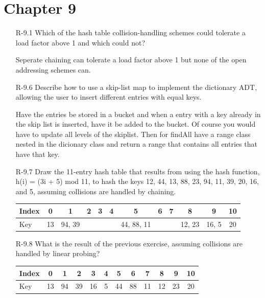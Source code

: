 \section{Chapter 9}

\begin{itemize}
    \item[R-9.1]  Which of the hash table collision-handling schemes could tolerate a load
          factor above 1 and which could not?

          \answer Seperate chaining can tolerate a load factor above 1 but none of the
          open addressing schemes can.

    \item[R-9.6]  Describe how to use a skip-list map to implement the dictionary ADT,
          allowing the user to insert different entries with equal keys.

          \answer Have the entries be stored in a bucket and when a entry with a key already
          in the skip list is inserted, have it be added to the bucket. Of course you would have
          to update all levels of the skiplist. Then for findAll have a range class nested in the
          dicionary class and return a range that contains all entries that have that key.

    \item[R-9.7]  Draw the 11-entry hash table that results from using the hash function,
          h(i) = (3i + 5) mod 11, to hash the keys 12, 44, 13, 88, 23, 94, 11, 39, 20,
          16, and 5, assuming collisions are handled by chaining.

          \answer
          \begin{center}
              \begin{tabular}{|l|*{11}{c|}}
                  \hline
                  Index & 0  & 1      & 2 & 3 & 4 & 5          & 6 & 7 & 8      & 9     & 10 \\
                  \hline
                  Key   & 13 & 94, 39 &   &   &   & 44, 88, 11 &   &   & 12, 23 & 16, 5 & 20 \\
                  \hline
              \end{tabular}
          \end{center}

    \item[R-9.8] What is the result of the previous exercise, assuming collisions are handled
     by linear probing?

          \answer
          \begin{center}
              \begin{tabular}{|l|*{11}{c|}}
                  \hline
                  Index & 0  & 1  & 2  & 3  & 4 & 5  & 6  & 7  & 8  & 9  & 10 \\
                  \hline
                  Key   & 13 & 94 & 39 & 16 & 5 & 44 & 88 & 11 & 12 & 23 & 20 \\
                  \hline
              \end{tabular}
          \end{center}


\end{itemize}
